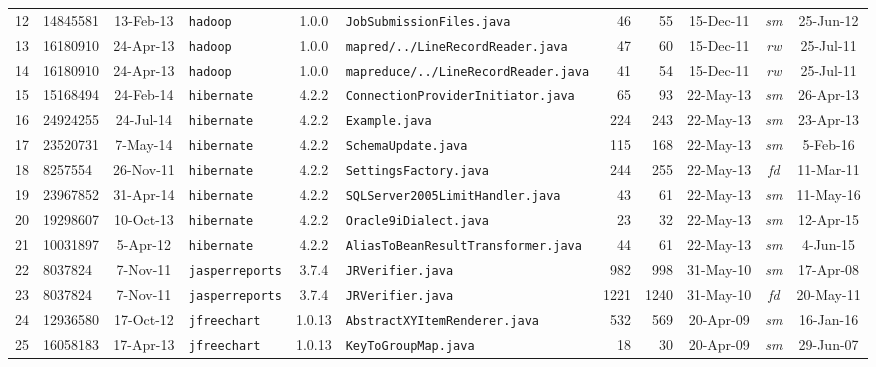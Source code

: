 \documentclass[sigconf,review, anonymous]{acmart}
\begin{document}
\begin{table}
{\begin{tabular}{r|l|c|l|c|p{5cm}|r|r|c|c|c}
			12 & 14845581 & 13-Feb-13 & \texttt{hadoop} & 1.0.0 & \texttt{JobSubmissionFiles.java}  & 46 & 55 & 15-Dec-11 & \textit{sm} & 25-Jun-12 \\
			13 & 16180910 & 24-Apr-13 & \texttt{hadoop} & 1.0.0 & \texttt{mapred/../LineRecordReader.java}  & 47 & 60 & 15-Dec-11 & \textit{rw} & 25-Jul-11 \\
			14 & 16180910 & 24-Apr-13 & \texttt{hadoop} & 1.0.0 & \texttt{mapreduce/../LineRecordReader.java}  & 41 & 54 & 15-Dec-11 & \textit{rw} & 25-Jul-11 \\
			15 & 15168494 & 24-Feb-14 & \texttt{hibernate} & 4.2.2 & \texttt{ConnectionProviderInitiator.java}  & 65 & 93 & 22-May-13 & \textit{sm} & 26-Apr-13 \\
			16 & 24924255 & 24-Jul-14 & \texttt{hibernate} & 4.2.2 & \texttt{Example.java}  & 224 & 243 & 22-May-13 & \textit{sm} & 23-Apr-13 \\
			17 & 23520731 & 7-May-14 & \texttt{hibernate} & 4.2.2 & \texttt{SchemaUpdate.java}  & 115 & 168 & 22-May-13 & \textit{sm} & 5-Feb-16 \\
			18 & 8257554 & 26-Nov-11 & \texttt{hibernate} & 4.2.2 & \texttt{SettingsFactory.java}  & 244 & 255 & 22-May-13 & \textit{fd} & 11-Mar-11 \\
			19 & 23967852 & 31-Apr-14 & \texttt{hibernate} & 4.2.2 & \texttt{SQLServer2005LimitHandler.java}  & 43 & 61 & 22-May-13 & \textit{sm} & 11-May-16 \\
			20 & 19298607 & 10-Oct-13 & \texttt{hibernate} & 4.2.2 & \texttt{Oracle9iDialect.java} & 23 & 32 & 22-May-13 & \textit{sm} & 12-Apr-15 \\
			21 & 10031897 & 5-Apr-12 & \texttt{hibernate} & 4.2.2 & \texttt{AliasToBeanResultTransformer.java} & 44 & 61 & 22-May-13 & \textit{sm} & 4-Jun-15 \\ 
			22 & 8037824 & 7-Nov-11 & \texttt{jasperreports} & 3.7.4 & \texttt{JRVerifier.java}  & 982 & 998 & 31-May-10 & \textit{sm} & 17-Apr-08 \\
			23 & 8037824 & 7-Nov-11 & \texttt{jasperreports} & 3.7.4 & \texttt{JRVerifier.java}  & 1221 & 1240 & 31-May-10 & \textit{fd} & 20-May-11 \\
			24 & 12936580 & 17-Oct-12 & \texttt{jfreechart} & 1.0.13 & \texttt{AbstractXYItemRenderer.java}  & 532 & 569 & 20-Apr-09 & \textit{sm} & 16-Jan-16 \\
			25 & 16058183 & 17-Apr-13 & \texttt{jfreechart} & 1.0.13 & \texttt{KeyToGroupMap.java}  & 18 & 30 & 20-Apr-09 & \textit{sm} & 29-Jun-07 \\

\end{tabular}}
\end{table}
\end{document}
